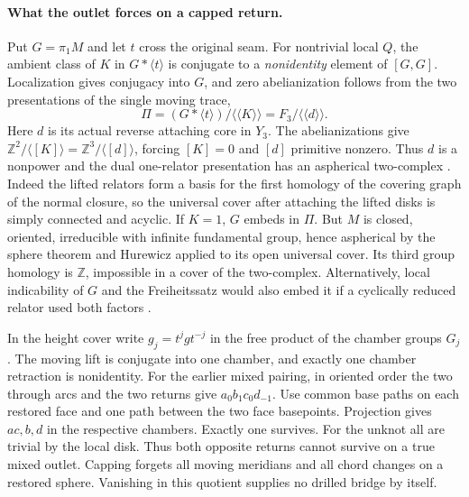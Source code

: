 \documentclass[11pt,letterpaper]{article}
\numberwithin{equation}{section}
\theoremstyle{remark}
\begin{document}
\paragraph{What the outlet forces on a capped return.}
Put \(G=\pi_1M\) and let \(t\) cross the original seam. For nontrivial
local \(Q\), the ambient class of \(K\) in \(G*\langle t\rangle\)
is conjugate to a \emph{nonidentity} element of \([G,G]\).
Localization gives conjugacy into \(G\), and zero abelianization follows
from the two presentations of the single moving trace,
\[
 \Pi=(G*\langle t\rangle)/\langle\!\langle K\rangle\!\rangle
    =F_3/\langle\!\langle d\rangle\!\rangle .
\]
Here \(d\) is its actual reverse attaching core in \(Y_3\).
The abelianizations give \(\mathbb Z^2/\langle[K]\rangle
=\mathbb Z^3/\langle[d]\rangle\), forcing \([K]=0\) and
\([d]\) primitive nonzero. Thus \(d\) is a nonpower and the dual
one-relator presentation has an aspherical two-complex
\cite[Corollary 6.5(i), applied to the free-group relation module]{AntolinDicksLinnell2011}.
Indeed the lifted relators form a basis for the first homology of the
covering graph of the normal closure, so the universal cover after
attaching the lifted disks is simply connected and acyclic.
If \(K=1\), \(G\) embeds in \(\Pi\). But \(M\) is closed, oriented,
irreducible with infinite fundamental group, hence aspherical
by the sphere theorem and Hurewicz applied to its open universal cover.
Its third group homology is \(\mathbb Z\), impossible in a cover of the
two-complex. Alternatively, local indicability of \(G\) and the
Freiheitssatz would also embed it if a cyclically reduced relator
used both factors
\cite[Theorem 3.1]{BoyerRolfsenWiest2005}\cite[Corollary 4.4]{AntolinDicksLinnell2011}.

In the height cover write \(g_j=t^jgt^{-j}\) in the free product of
the chamber groups \(G_j\). The moving lift is conjugate into one chamber,
and exactly one chamber retraction is nonidentity. For the earlier mixed
pairing, in oriented order the two through arcs and the two returns give
\(a_0 b_1 c_0 d_{-1}\). Use common base paths on each restored face
and one path between the two face basepoints. Projection gives
\(ac,b,d\) in the respective chambers. Exactly one survives. For the
unknot all are trivial by the local disk. Thus both opposite returns
cannot survive on a true mixed outlet. Capping forgets all moving
meridians and all chord changes on a restored sphere. Vanishing in
this quotient supplies no drilled bridge by itself.
\end{document}
